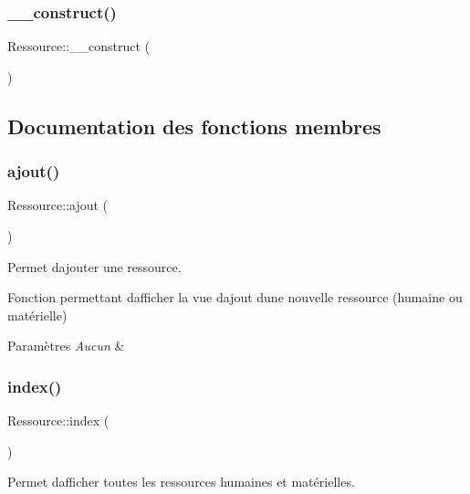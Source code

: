 \subsubsection{\texorpdfstring{\+\_\+\+\_\+construct()}{\_\_construct()}}
{\footnotesize\ttfamily Ressource\+::\+\_\+\+\_\+construct (\begin{DoxyParamCaption}{ }\end{DoxyParamCaption})}



\subsection{Documentation des fonctions membres}
\mbox{\label{class_ressource_a39214a947c930104701f0589f896c2e4}} 
\subsubsection{\texorpdfstring{ajout()}{ajout()}}
{\footnotesize\ttfamily Ressource\+::ajout (\begin{DoxyParamCaption}{ }\end{DoxyParamCaption})}



Permet d\textquotesingle{}ajouter une ressource. 

Fonction permettant d\textquotesingle{}afficher la vue d\textquotesingle{}ajout d\textquotesingle{}une nouvelle ressource (humaine ou matérielle) 
\begin{DoxyParams}{Paramètres}
{\em Aucun} & \\
\hline
\end{DoxyParams}
\mbox{\label{class_ressource_a4951ac26fe2cd5bd2e943145f11243c8}} 
\subsubsection{\texorpdfstring{index()}{index()}}
{\footnotesize\ttfamily Ressource\+::index (\begin{DoxyParamCaption}{ }\end{DoxyParamCaption})}



Permet d\textquotesingle{}afficher toutes les ressources humaines et matérielles. 

